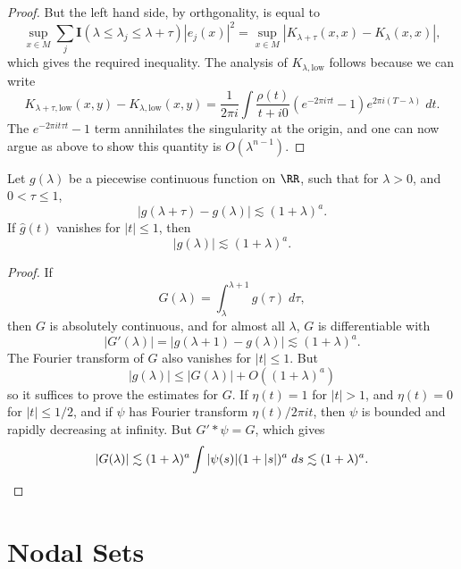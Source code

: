 \begin{proof}
    But the left hand side, by orthgonality, is equal to
    \[ \sup_{x \in M} \sum_j \mathbf{I}(\lambda \leq \lambda_j \leq \lambda + \tau) |e_j(x)|^2 = \sup_{x \in M} |K_{\lambda + \tau}(x,x) - K_{\lambda}(x,x)|, \]
    which gives the required inequality. The analysis of $K_{\lambda, \text{low}}$ follows because we can write
    \[ K_{\lambda + \tau, \text{low}}(x,y) - K_{\lambda, \text{low}}(x,y) = \frac{1}{2 \pi i} \int \frac{\rho(t)}{t + i0} (e^{-2 \pi i \tau t} - 1) e^{2 \pi i (T - \lambda)}\; dt. \]
    The $e^{-2 \pi i t \tau t} - 1$ term annihilates the singularity at the origin, and one can now argue as above to show this quantity is $O(\lambda^{n-1})$.
\end{proof}

\begin{lemma}
    Let $g(\lambda)$ be a piecewise continuous function on $\RR$, such that for $\lambda > 0$, and $0 < \tau \leq 1$,
    \[ |g(\lambda + \tau) - g(\lambda)| \lesssim (1 + \lambda)^a. \]
    If $\widehat{g}(t)$ vanishes for $|t| \leq 1$, then
    \[ |g(\lambda)| \lesssim (1 + \lambda)^a. \]
\end{lemma}
\begin{proof}
    If
    \[ G(\lambda) = \int_\lambda^{\lambda + 1} g(\tau)\; d\tau, \]
    then $G$ is absolutely continuous, and for almost all $\lambda$, $G$ is differentiable with
    \[ |G'(\lambda)| = |g(\lambda + 1) - g(\lambda)| \lesssim (1 + \lambda)^a. \]
    The Fourier transform of $G$ also vanishes for $|t| \leq 1$. But
    \[ |g(\lambda)| \leq |G(\lambda)| + O((1 + \lambda)^a) \]
    so it suffices to prove the estimates for $G$. If $\eta(t) = 1$ for $|t| > 1$, and $\eta(t) = 0$ for $|t| \leq 1/2$, and if $\psi$ has Fourier transform $\eta(t) / 2 \pi i t$, then $\psi$ is bounded and rapidly decreasing at infinity. But $G' * \psi = G$, which gives
    \[ |G(\lambda)| \lesssim (1 + \lambda)^a \int |\psi(s)| (1 + |s|)^a\; ds \lesssim (1 + \lambda)^a. \qedhere \]
\end{proof}






\chapter{Nodal Sets}

